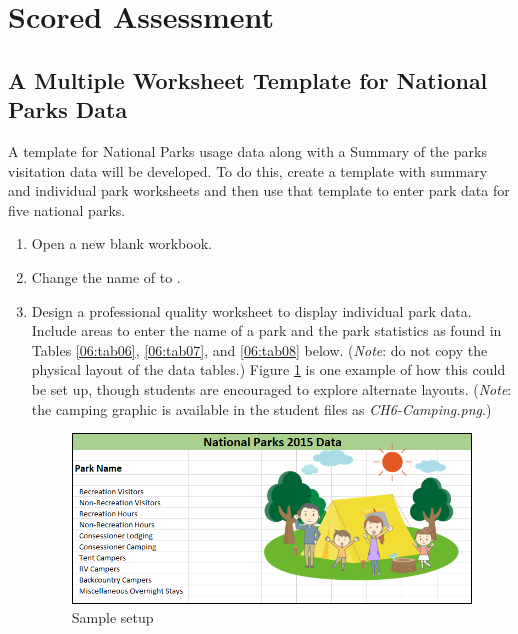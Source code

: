 \section{Scored Assessment}

\subsection{A Multiple Worksheet Template for National Parks Data}

A template for National Parks usage data along with a Summary of the parks visitation data will be developed. To do this, create a template with summary and individual park worksheets and then use that template to enter park data for five national parks.

\begin{enumbox}
	\begin{enumerate}
		\item Open a new blank workbook.
		\item Change the name of  to . 
		\item Design a professional quality worksheet to display individual park data. Include areas to enter the name of a park and the park statistics as found in Tables \ref{06:tab06}, \ref{06:tab07}, and \ref{06:tab08} below. (\textit{Note}: do not copy the physical layout of the data tables.) Figure \ref{06:fig17} is one example of how this could be set up, though students are encouraged to explore alternate layouts. (\textit{Note}: the camping graphic is available in the student files as \textit{CH6-Camping.png}.)

		\begin{figure}[H]
			\centering
			\includegraphics[width=\maxwidth{.95\linewidth}]{gfx/ch06_fig17}
			\caption{Sample setup}
			\label{06:fig17}
		\end{figure}


\end{enumerate}
\end{enumbox}
